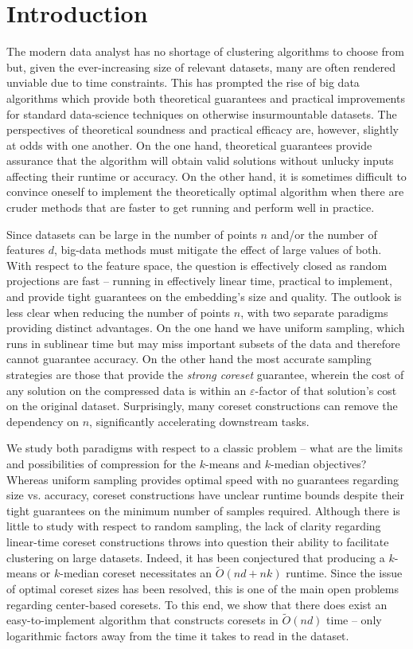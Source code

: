 \section{Introduction}

The modern data analyst has no shortage of clustering algorithms to choose from but, given the ever-increasing size of relevant datasets, many are often
rendered unviable due to time constraints. This has prompted the rise of big data algorithms which provide both theoretical guarantees and
practical improvements for standard data-science techniques on otherwise insurmountable datasets. The perspectives
of theoretical soundness and practical efficacy are, however, slightly at odds with one another. On the one hand, theoretical guarantees provide assurance that
the algorithm will obtain valid solutions without unlucky inputs affecting their runtime or accuracy. On the other hand, it is sometimes difficult to convince
oneself to implement the theoretically optimal algorithm when there are cruder methods that are faster to get running and perform well in practice.

Since datasets can be large in the number of points $n$ and/or the number of features $d$, big-data methods must mitigate the effect of large values of both.
With respect to the feature space, the question is effectively closed as random projections are fast -- running in effectively linear time, practical to
implement, and provide tight guarantees on the embedding's size and quality. The outlook is less clear when reducing the number of points $n$, with
two separate paradigms providing distinct advantages.  On the one hand we have uniform sampling, which runs in sublinear time but may miss important subsets of
the data and therefore cannot guarantee accuracy.  On the other hand the most accurate sampling strategies are those that provide the \emph{strong coreset}
guarantee, wherein the cost of any solution on the compressed data is within an $\varepsilon$-factor of that solution's cost on the original dataset.
Surprisingly, many coreset constructions can remove the dependency on $n$, significantly accelerating downstream tasks.

We study both paradigms with respect to a classic problem -- what are the limits and possibilities of compression for the $k$-means and $k$-median objectives?
Whereas uniform sampling provides optimal speed with no guarantees regarding size vs. accuracy, coreset constructions have
unclear runtime bounds despite their tight guarantees on the minimum number of samples required. Although there is little to study with respect to random
sampling, the lack of clarity regarding linear-time coreset constructions throws into question their ability to facilitate clustering on large datasets.
Indeed, it has been conjectured that producing a $k$-means or $k$-median coreset necessitates an $\tilde{O}(nd + nk)$ runtime.
Since the issue of optimal coreset sizes has been resolved, this is one of the main open problems regarding center-based coresets. To this end, we show that
there does exist an easy-to-implement algorithm that constructs coresets in $\tilde{O}(nd)$ time -- only logarithmic factors away from the time it takes to read
in the dataset.

